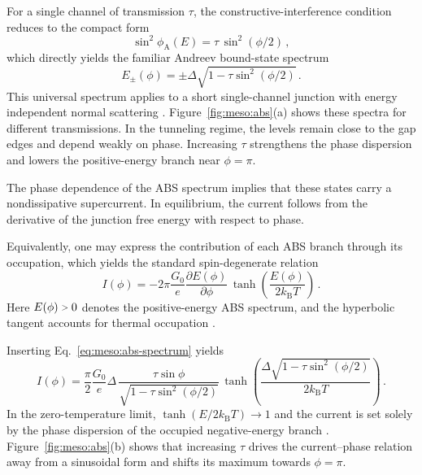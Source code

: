             For a single channel of transmission $\tau$, the constructive-interference condition reduces to the compact form
            \begin{equation}
                \sin^2\!\phi_\mathrm{A}(E) = \tau\,\sin^2\!\left(\phi/2\right)\,,
            \end{equation}
            which directly yields the familiar Andreev bound-state spectrum
            \begin{equation}
                E_{\pm}(\phi)=\pm\Delta\sqrt{1-\tau\sin^2\!\left(\phi/2\right)}\,.
                \label{eq:meso:abs-spectrum}
            \end{equation}
            This universal spectrum applies to a short single-channel junction with energy independent normal scattering \cite{beenakker_josephson_1991,beenakker_quantum_1992}. Figure~\ref{fig:meso:abs}(a) shows these spectra for different transmissions. In the tunneling regime, the levels remain close to the gap edges and depend weakly on phase. Increasing $\tau$ strengthens the phase dispersion and lowers the positive-energy branch near $\phi=\pi$.

            The phase dependence of the ABS spectrum implies that these states carry a nondissipative supercurrent. In equilibrium, the current follows from the derivative of the junction free energy with respect to phase.

            Equivalently, one may express the contribution of each ABS branch through its occupation, which yields the standard spin-degenerate relation
            \begin{equation}
                I(\phi)=-2\pi \frac{G_0}{e} \frac{\partial E(\phi)}{\partial \phi}\,\tanh\!\left(\frac{E(\phi)}{2k_\mathrm{B}T}\right)\,.
            \end{equation}
            Here $E(\phi)\sgt{}0$ denotes the positive-energy ABS spectrum, and the hyperbolic tangent accounts for thermal occupation \cite{beenakker_josephson_1991,beenakker_quantum_1992}.

            Inserting Eq.~\eqref{eq:meso:abs-spectrum} yields
            \begin{equation}
                I(\phi)=\frac{\pi}{2}\frac{G_0}{e}\Delta\,
                \frac{\tau\sin\phi}{\sqrt{1-\tau\sin^2\!\left(\phi/2\right)}}\,
                \tanh\!\left(\frac{\Delta\sqrt{1-\tau\sin^2\!\left(\phi/2\right)}}{2k_\mathrm{B}T}\right)\,.
                \label{eq:meso:cpr-single}
            \end{equation}
            In the zero-temperature limit, $\tanh\!\left(E/2k_\mathrm{B}T\right)\to 1$ and the current is set solely by the phase dispersion of the occupied negative-energy branch \cite{beenakker_josephson_1991}. Figure~\ref{fig:meso:abs}(b) shows that increasing $\tau$ drives the current--phase relation away from a sinusoidal form and shifts its maximum towards $\phi=\pi$.

